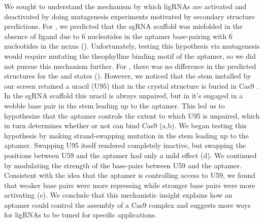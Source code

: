\documentclass[10pt,oneside]{article}
\begin{document}
We sought to understand the mechanism by which ligRNAs are activated and deactivated by doing mutagenesis experiments motivated by \insilico{} secondary structure predictions.  For \ligrnaF{}, we predicted that the sgRNA scaffold was misfolded in the absence of ligand due to 6 nucleotides in the aptamer base-pairing with 6 nucleotides in the nexus ().  Unfortunately, testing this hypothesis via mutagenesis would require mutating the theophylline binding motif of the aptamer, so we did not pursue this mechanism further.  For \ligrnaB{}, there was no difference in the predicted structures for the \apo{} and \holo{} states ().  However, we noticed that the stem installed by our screen retained a uracil (U95) that in the crystal structure is buried in Cas9 \autocite{nishimasu2014}.  In the sgRNA scaffold this uracil is always unpaired, but in \ligrnaB{} it's engaged in a wobble base pair in the stem leading up to the aptamer.  This led us to hypothesize that the aptamer controls the extent to which U95 is unpaired, which in turn determines whether or not \ligrnaB{} can bind Cas9 (a,b).  We began testing this hypothesis by making strand-swapping mutation in the stem leading up to the aptamer.  Swapping U95 itself rendered \ligrnaB{} completely inactive, but swapping the positions between U59 and the aptamer had only a mild effect (d).  We continued by modulating the strength of the base-pairs between U59 and the aptamer.  Consistent with the idea that the aptamer is controlling access to U59, we found that weaker base pairs were more repressing while stronger base pairs were more activating (e).  We conclude that this mechanistic insight explains how an aptamer could control the assembly of a Cas9 complex and suggests more ways for ligRNAs to be tuned for specific applications.

\end{document}
